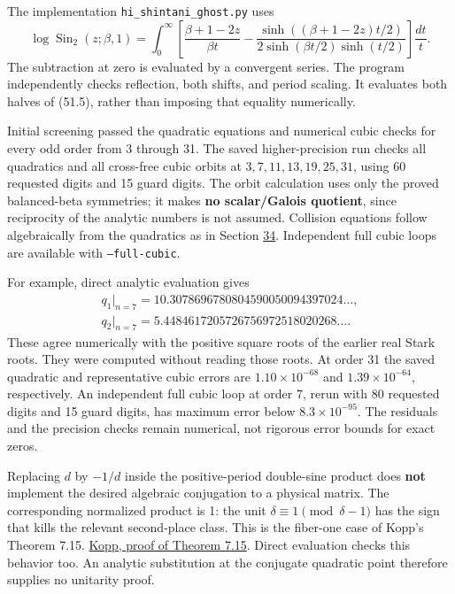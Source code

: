 \documentclass[11pt,reqno]{amsart}
\theoremstyle{plain}
\begin{document}
The implementation \texttt{hi\_\allowbreak shintani\_\allowbreak ghost.py} uses
\begin{equation*}
 \log\operatorname{Sin}_2(z;\beta,1)=
 \int_0^\infty\left[
 \frac{\beta+1-2z}{\beta t}
 -\frac{\sinh((\beta+1-2z)t/2)}{2\sinh(\beta t/2)\sinh(t/2)}
 \right]\frac{dt}{t}.
 \tag{51.8}
\end{equation*}
The subtraction at zero is evaluated by a convergent series. The
program independently checks reflection, both shifts, and period
scaling. It evaluates both halves of (51.5), rather than imposing
that equality numerically.

Initial screening passed the quadratic equations and numerical cubic
checks for every odd order from 3 through 31. The saved higher-precision
run checks all quadratics and all cross-free cubic orbits at
\(3,7,11,13,19,25,31\), using 60 requested digits and 15 guard digits.
The orbit calculation uses only the proved balanced-beta symmetries;
it makes \textbf{no scalar/Galois quotient}, since reciprocity of the analytic
numbers is not assumed. Collision equations follow algebraically from
the quadratics as in Section \hyperref[sec:34]{34}. Independent full cubic loops are
available with \texttt{--full-cubic}.

For example, direct analytic evaluation gives
\[
 \begin{gathered}
 q_1\big|_{n=7}=10.3078696780804590050094397024\ldots,\\
 q_2\big|_{n=7}=5.4484617205726756972518020268\ldots.
 \end{gathered}
\]
These agree numerically with the positive square roots of the earlier
real Stark roots. They were computed without reading those roots.
At order 31 the saved quadratic and representative cubic errors are
\(1.10\times10^{-68}\) and \(1.39\times10^{-64}\), respectively.
An independent full cubic loop at order 7, rerun with 80 requested
digits and 15 guard digits, has maximum error below \(8.3\times10^{-95}\).
The residuals and the precision checks remain numerical, not rigorous
error bounds for exact zeros.

Replacing \(d\) by \(-1/d\) inside the positive-period double-sine
product does \textbf{not} implement the desired algebraic conjugation to a
physical matrix. The corresponding normalized product is 1: the unit
\(\delta\equiv1\pmod{\delta-1}\) has the sign that kills the relevant
second-place class. This is the fiber-one case of Kopp's
Theorem 7.15. \href{https://arxiv.org/html/2411.06763v2\#S7.SS2}{Kopp, proof of Theorem 7.15}.
Direct evaluation checks this behavior too. An analytic substitution
at the conjugate quadratic point therefore supplies no unitarity proof.
\end{document}
